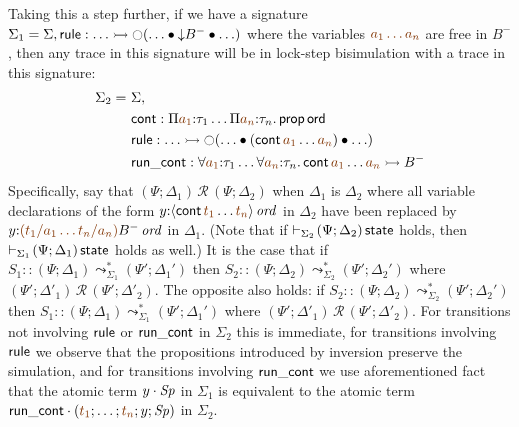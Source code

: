 Taking this a step further, if we have a signature
$\Sigma_1 = \Sigma, {\sf rule} : \ldots \rightarrowtail {\ocircle}(\ldots \mathbin{\bullet} {\downarrow}B^- \mathbin{\bullet} \ldots)
$
where the variables $\lf{a_1\ldots a_n}$ are free in $B^-$, 
then any trace in this signature will be in lock-step bisimulation
with a trace in this signature: 
\begin{align*}
\Sigma_2 = ~ & \Sigma,
\\    ~~ & {\sf cont} :  \Pi\lf{a_1}{:}\tau_1\ldots \Pi\lf{a_n}{:}\tau_n.\,{\sf prop}\,{\sf ord}
\\    ~~ & {\sf rule} : \ldots \lefti {\ocircle}(\ldots \fuse ({\sf cont}\,\lf{a_1}\ldots\lf{a_n}) \fuse \ldots)
\\    ~~ & {\sf run\_cont} : \forall\lf{a_1}{:}\tau_1\ldots \forall\lf{a_n}{:}\tau_n.\,{\sf cont}\,\lf{a_1}\ldots\lf{a_n} \lefti B^-
\end{align*}
Specifically, 
say that $(\Psi; \Delta_1) \,\mathcal R\, (\Psi; \Delta_2)$ when 
$\Delta_1$ is $\Delta_2$ where all variable declarations of the form 
$y{:}\istrue{\susp{{\sf cont}\,\lf{t_1}\ldots\lf{t_n}}}$ in $\Delta_2$ have been
replaced by $y{:}\istrue{\lf{(t_1/a_1\ldots t_n/a_n)}B^-}$ in $\Delta_1$. 
(Note that if $\vdash_{\Sigma_2} \!(\Psi; \Delta_2)\,{\sf state}$ holds, then 
 $\vdash_{\Sigma_1} \!(\Psi; \Delta_1)\,{\sf state}$ holds as well.)
It is the case that if
$S_1 :: (\Psi; \Delta_1) \leadsto^*_{\Sigma_1} (\Psi'; \Delta_1')$
then $S_2 :: (\Psi; \Delta_2) \leadsto^*_{\Sigma_2} (\Psi'; \Delta_2')$
where $(\Psi'; \Delta'_1) \,\mathcal R\, (\Psi'; \Delta'_2)$. 
The opposite also holds: if
$S_2 :: (\Psi; \Delta_2) \leadsto^*_{\Sigma_2} (\Psi'; \Delta_2')$
then $S_1 :: (\Psi; \Delta_1) \leadsto^*_{\Sigma_1} (\Psi'; \Delta_1')$
where $(\Psi'; \Delta'_1) \,\mathcal R\, (\Psi'; \Delta'_2)$. For transitions
not involving ${\sf rule}$ or ${\sf run\_cont}$ in $\Sigma_2$ this is immediate,
for transitions involving ${\sf rule}$ we observe that the propositions
introduced by inversion preserve the simulation, and for transitions 
involving ${\sf run\_cont}$ we use aforementioned fact that the atomic term
${y} \cdot {{\it Sp}}$ in $\Sigma_1$ is equivalent to the atomic term
$\tfocusl{\sf run\_cont}{(\lf{t_1}; \ldots; \lf{t_n}; y; \Sp)}$ in $\Sigma_2$. 

